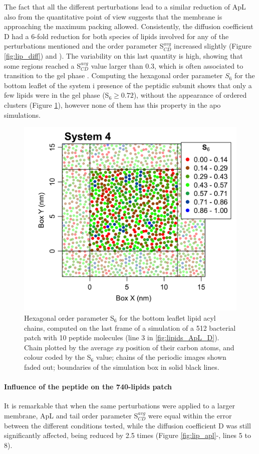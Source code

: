 The fact that all the different perturbations lead to a similar reduction of ApL also from the quantitative point of view suggests that the membrane is approaching the maximum packing allowed.
%
Consistently, the diffusion coefficient D had a 6-fold reduction for both species of lipids involved for any of the perturbations mentioned and the order parameter S$^{avg}_{CD}$ increased slightly (Figure \ref{fig:lip_diff}) and ). The variability on this last quantity is high, showing that some regions reached a S$^{avg}_{CD}$ value larger than 0.3, which is often associated to transition to the gel phase \cite{Pluhackova2016}.
%
Computing the hexagonal order parameter $S_6$ for the bottom leaflet of the system i presence of the peptidic subunit shows that only a few lipids were in the gel phase (S$_6 \ge 0.72$), without the appearance of ordered clusters (Figure \ref{fig:S6_pb4}), however none of them has this property in the apo simulations.
%
\begin{figure}[h!]
\centering
\includegraphics[width=0.5\linewidth]{3results_capsule/pics/pb4_S6.png} 
\caption[Hexagonal order parameter of lipids in protein-lipid simulation]{Hexagonal order parameter S$_6$ for the bottom leaflet lipid acyl chains, computed on the last frame of a simulation of a 512 bacterial patch with 10 peptide molecules (line 3 in \ref{fig:lipids_ApL_D}). Chain plotted by the average $xy$ position of their carbon atoms, and colour coded by the S$_6$ value; chains of the periodic images shown faded out; boundaries of the simulation box in solid black lines.}
\label{fig:S6_pb4}
\end{figure}

\paragraph{Influence of the peptide on the 740-lipids patch} It is remarkable that when the same perturbations were applied to a larger membrane, ApL and tail order parameter S$^{avg}_{CD}$ were equal within the error between the different conditions tested, while the diffusion coefficient D was still significantly affected, being reduced by 2.5 times (Figure \ref{fig:lip_apl}-, lines 5 to 8).

